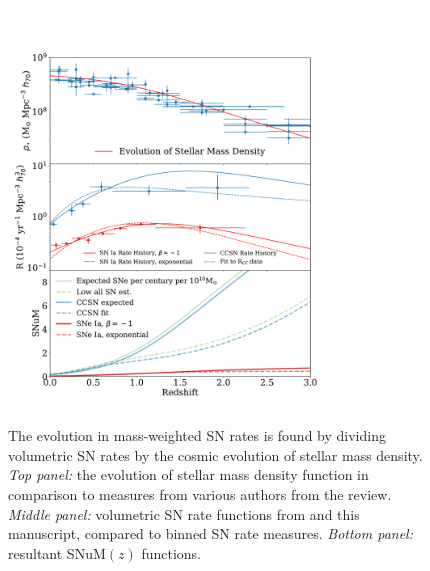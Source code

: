 \documentclass[apj]{aastex62}
\begin{document}
\begin{figure}[t] 
   \centering
   \includegraphics[width=3.5in]{SNuM_all.pdf}
   \caption{\footnotesize The evolution in mass-weighted SN rates is found by dividing volumetric SN rates by the cosmic evolution of stellar mass density. \textit{Top panel:} the evolution of stellar mass density function in comparison to measures from various authors from the \cite{Madau:2014fk} review. \textit{Middle panel:} volumetric SN rate functions from \cite{Strolger:2015aa} and this manuscript, compared to binned SN rate measures.  \textit{Bottom panel:} resultant SNuM$(z)$ functions.}
   \label{fig:SNuM}
\end{figure}
\end{document}
